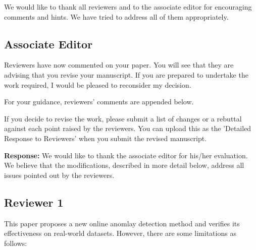 \documentclass{article}
\makeatletter
\newenvironment{comment}{
\begin{sloppypar}\slshape
\vspace{5 mm}
\color{blue}
 \@beginparpenalty\@M
  \begin{list}{}{\setlength{\topsep}{0ex}%
  \setlength{\leftmargin}{\rightmargin}}\item[]
 \@beginparpenalty\@endparpenalty
}
{\end{list}
\end{sloppypar}
}
\makeatother
\begin{document}
We would like to thank all reviewers and to the associate editor for
encouraging comments and hints. We have tried to address all of them
appropriately.

\subsection*{Associate Editor}

\begin{comment}
Reviewers have now commented on your paper. You will see that they are advising that you revise your manuscript. If you are prepared to undertake the work required, I would be pleased to reconsider my decision.

For your guidance, reviewers' comments are appended below.

If you decide to revise the work, please submit a list of changes or a rebuttal against each point raised by the reviewers. You can upload this as the 'Detailed Response to Reviewers' when you submit the revised manuscript.
\end{comment}
{\bf Response:}
We would like to thank the associate editor for his/her evaluation. We
believe that the modifications, described in more detail below,
address all issues pointed out by the reviewers.

\subsection*{Reviewer 1}
\begin{comment}
This paper proposes a new online anomlay detection method and verifies its effectiveness on real-world datasets. However, there are some limitations as follows:
\end{comment}
\end{document}
